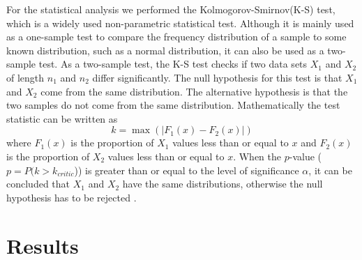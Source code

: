 \documentclass[12pt,letterpaper]{article}
\begin{document}
For the statistical analysis we performed the Kolmogorov-Smirnov(K-S) \citep{Barr1973, Lopes2007}
test, which is a widely used non-parametric statistical test.
Although it is mainly used as a one-sample test to compare the
frequency distribution of a sample to some known distribution, such as
a normal distribution, it can also be used as a two-sample test. As a
two-sample test, the K-S test checks if two data sets $X_1$ and $X_2$
of length $n_1$ and $n_2$ differ significantly. The null hypothesis
for this test is that $X_1$ and $X_2$ come from the same
distribution. The alternative hypothesis is that the two samples do
not come from the same distribution. Mathematically the test statistic
can be written as
\begin{equation}
  k=\max(|F_1(x)-F_2(x)|)
  \label{eq:three}
\end{equation}
where $F_1(x)$ is the proportion of $X_1$ values less than or equal to
$x$ and $F_2(x)$ is the proportion of $X_2$ values less than or equal
to $x$. When the $p$-value ( $p=P(k>k_{critic}$)) is greater than or
equal to the level of significance $\alpha$, it can be concluded that
$X_1$ and $X_2$ have the same distributions, otherwise the null
hypothesis has to be rejected \citep{Biswas2008}.

\section{Results}\label{results}
\end{document}
